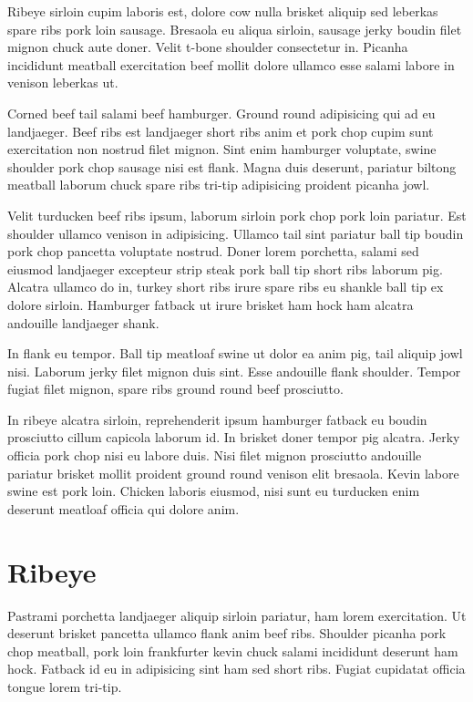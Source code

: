 \documentclass[a4paper,10pt]{article}
\begin{document}
Ribeye sirloin cupim laboris est, dolore cow nulla brisket aliquip sed leberkas spare ribs pork loin sausage. Bresaola eu aliqua sirloin, sausage jerky boudin filet mignon chuck aute doner. Velit t-bone shoulder consectetur in. Picanha incididunt meatball exercitation beef mollit dolore ullamco esse salami labore in venison leberkas ut.

Corned beef tail salami beef hamburger. Ground round adipisicing qui ad eu landjaeger. Beef ribs est landjaeger short ribs anim et pork chop cupim sunt exercitation non nostrud filet mignon. Sint enim hamburger voluptate, swine shoulder pork chop sausage nisi est flank. Magna duis deserunt, pariatur biltong meatball laborum chuck spare ribs tri-tip adipisicing proident picanha jowl.

Velit turducken beef ribs ipsum, laborum sirloin pork chop pork loin pariatur. Est shoulder ullamco venison in adipisicing. Ullamco tail sint pariatur ball tip boudin pork chop pancetta voluptate nostrud. Doner lorem porchetta, salami sed eiusmod landjaeger excepteur strip steak pork ball tip short ribs laborum pig. Alcatra ullamco do in, turkey short ribs irure spare ribs eu shankle ball tip ex dolore sirloin. Hamburger fatback ut irure brisket ham hock ham alcatra andouille landjaeger shank.

In flank eu tempor. Ball tip meatloaf swine ut dolor ea anim pig, tail aliquip jowl nisi. Laborum jerky filet mignon duis sint. Esse andouille flank shoulder. Tempor fugiat filet mignon, spare ribs ground round beef prosciutto.

In ribeye alcatra sirloin, reprehenderit ipsum hamburger fatback eu boudin prosciutto cillum capicola laborum id. In brisket doner tempor pig alcatra. Jerky officia pork chop nisi eu labore duis. Nisi filet mignon prosciutto andouille pariatur brisket mollit proident ground round venison elit bresaola. Kevin labore swine est pork loin. Chicken laboris eiusmod, nisi sunt eu turducken enim deserunt meatloaf officia qui dolore anim.

\section{Ribeye}

Pastrami porchetta landjaeger aliquip sirloin pariatur, ham lorem exercitation. Ut deserunt brisket pancetta ullamco flank anim beef ribs. Shoulder picanha pork chop meatball, pork loin frankfurter kevin chuck salami incididunt deserunt ham hock. Fatback id eu in adipisicing sint ham sed short ribs. Fugiat cupidatat officia tongue lorem tri-tip.
\end{document}
